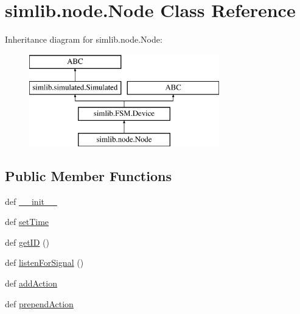 \hypertarget{classsimlib_1_1node_1_1_node}{}\section{simlib.\+node.\+Node Class Reference}
\label{classsimlib_1_1node_1_1_node}
Inheritance diagram for simlib.\+node.\+Node\+:\begin{figure}[H]
\begin{center}
\leavevmode
\includegraphics[height=4.000000cm]{classsimlib_1_1node_1_1_node}
\end{center}
\end{figure}
\subsection*{Public Member Functions}
\begin{DoxyCompactItemize}
\item 
def \mbox{\hyperlink{classsimlib_1_1node_1_1_node_ac6ef99e7e1c00c83ab001912a3d877b3}{\+\_\+\+\_\+init\+\_\+\+\_\+}}
\item 
def \mbox{\hyperlink{classsimlib_1_1node_1_1_node_a974a9b9f6f25605316255eb0e66e9f56}{set\+Time}}
\item 
def \mbox{\hyperlink{classsimlib_1_1node_1_1_node_a0bacc9e18647d14375eb93c26745d83c}{get\+ID}} ()
\item 
def \mbox{\hyperlink{classsimlib_1_1node_1_1_node_aa1c426997905e0825fdd529fe07f5538}{listen\+For\+Signal}} ()
\item 
def \mbox{\hyperlink{classsimlib_1_1node_1_1_node_a8c20a00c9d19ea5762c1388eaf232737}{add\+Action}}
\item 
def \mbox{\hyperlink{classsimlib_1_1node_1_1_node_a6ddb478f68f40125776533ea5c4f03b0}{prepend\+Action}}
\end{DoxyCompactItemize}
